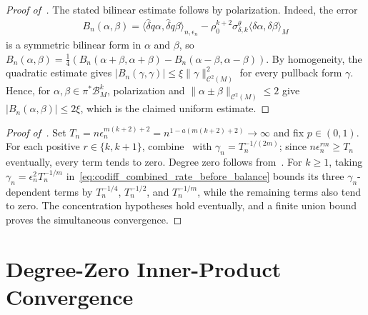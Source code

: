 \documentclass[11pt,reqno]{amsproc}
\numberwithin{equation}{section}
\newcommand{\cB}{\mathcal{B}}
\newcommand{\cC}{\mathcal{C}}
\newcommand{\hdelta}{\hat{\delta}}
\theoremstyle{definition}
\theoremstyle{plain}
\begin{document}
\begin{proof}[Proof of~]
    The stated bilinear estimate follows by polarization. Indeed, the error
    \begin{align}
        B_n(\alpha,\beta)=\langle\hdelta q\alpha,\hdelta q\beta\rangle_{n,\epsilon_n}-\rho_0^{k+2}\sigma^\theta_{\delta,k}\langle\delta\alpha,\delta\beta\rangle_M
    \end{align}
    is a symmetric bilinear form in $\alpha$ and $\beta$, so $B_n(\alpha,\beta)=\frac14\left(B_n(\alpha+\beta,\alpha+\beta)-B_n(\alpha-\beta,\alpha-\beta)\right)$.
    By homogeneity, the quadratic estimate gives $|B_n(\gamma,\gamma)|\leq \xi\|\gamma\|_{\cC^2(M)}^2$
    for every pullback form $\gamma$. Hence, for $\alpha,\beta\in\pi^*\cB_M^k$, polarization and $\|\alpha\pm\beta\|_{\cC^2(M)}\leq 2$ give $|B_n(\alpha,\beta)|\leq 2\xi$, which is the claimed uniform estimate.
\end{proof}


\begin{proof}[Proof of~]
    Set $T_n=n\epsilon_n^{m(k+2)+2}=n^{1-a(m(k+2)+2)}\to\infty$ and fix $p\in(0,1)$. For each positive $r\in\{k,k+1\}$, combine~ with $\gamma_n=T_n^{-1/(2m)}$; since $n\epsilon_n^{rm}\geq T_n$ eventually, every term tends to zero. Degree zero follows from~. For $k\geq1$, taking $\gamma_n=\epsilon_n^2T_n^{-1/m}$ in~\eqref{eq:codiff_combined_rate_before_balance} bounds its three $\gamma_n$-dependent terms by $T_n^{-1/4}$, $T_n^{-1/2}$, and $T_n^{-1/m}$, while the remaining terms also tend to zero. The concentration hypotheses hold eventually, and a finite union bound proves the simultaneous convergence.
\end{proof}

\appendix
\section{Degree-Zero Inner-Product Convergence} \label{app:degree_zero_inner_product}
\end{document}
